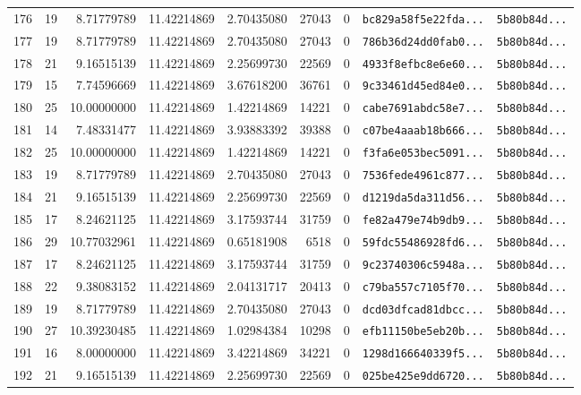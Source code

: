 \documentclass[10pt]{article}
\begin{document}
\begin{longtable}{rrrrrrrll}
  176 & 19 & 8.71779789 & 11.42214869 & 2.70435080 & 27043 & 0 & \texttt{bc829a58f5e22fda...} & \texttt{5b80b84d...} \\
  177 & 19 & 8.71779789 & 11.42214869 & 2.70435080 & 27043 & 0 & \texttt{786b36d24dd0fab0...} & \texttt{5b80b84d...} \\
  178 & 21 & 9.16515139 & 11.42214869 & 2.25699730 & 22569 & 0 & \texttt{4933f8efbc8e6e60...} & \texttt{5b80b84d...} \\
  179 & 15 & 7.74596669 & 11.42214869 & 3.67618200 & 36761 & 0 & \texttt{9c33461d45ed84e0...} & \texttt{5b80b84d...} \\
  180 & 25 & 10.00000000 & 11.42214869 & 1.42214869 & 14221 & 0 & \texttt{cabe7691abdc58e7...} & \texttt{5b80b84d...} \\
  181 & 14 & 7.48331477 & 11.42214869 & 3.93883392 & 39388 & 0 & \texttt{c07be4aaab18b666...} & \texttt{5b80b84d...} \\
  182 & 25 & 10.00000000 & 11.42214869 & 1.42214869 & 14221 & 0 & \texttt{f3fa6e053bec5091...} & \texttt{5b80b84d...} \\
  183 & 19 & 8.71779789 & 11.42214869 & 2.70435080 & 27043 & 0 & \texttt{7536fede4961c877...} & \texttt{5b80b84d...} \\
  184 & 21 & 9.16515139 & 11.42214869 & 2.25699730 & 22569 & 0 & \texttt{d1219da5da311d56...} & \texttt{5b80b84d...} \\
  185 & 17 & 8.24621125 & 11.42214869 & 3.17593744 & 31759 & 0 & \texttt{fe82a479e74b9db9...} & \texttt{5b80b84d...} \\
  186 & 29 & 10.77032961 & 11.42214869 & 0.65181908 & 6518 & 0 & \texttt{59fdc55486928fd6...} & \texttt{5b80b84d...} \\
  187 & 17 & 8.24621125 & 11.42214869 & 3.17593744 & 31759 & 0 & \texttt{9c23740306c5948a...} & \texttt{5b80b84d...} \\
  188 & 22 & 9.38083152 & 11.42214869 & 2.04131717 & 20413 & 0 & \texttt{c79ba557c7105f70...} & \texttt{5b80b84d...} \\
  189 & 19 & 8.71779789 & 11.42214869 & 2.70435080 & 27043 & 0 & \texttt{dcd03dfcad81dbcc...} & \texttt{5b80b84d...} \\
  190 & 27 & 10.39230485 & 11.42214869 & 1.02984384 & 10298 & 0 & \texttt{efb11150be5eb20b...} & \texttt{5b80b84d...} \\
  191 & 16 & 8.00000000 & 11.42214869 & 3.42214869 & 34221 & 0 & \texttt{1298d166640339f5...} & \texttt{5b80b84d...} \\
  192 & 21 & 9.16515139 & 11.42214869 & 2.25699730 & 22569 & 0 & \texttt{025be425e9dd6720...} & \texttt{5b80b84d...} \\

\end{longtable}
\end{document}
